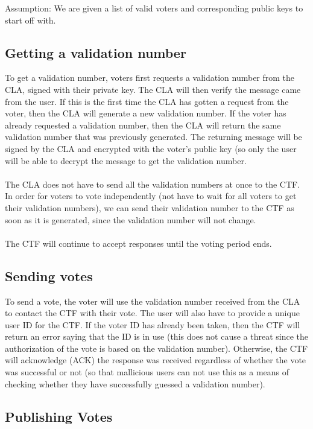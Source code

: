 \documentclass{article} \usepackage[margin=1in]{geometry} \usepackage{amsmath}
\begin{document}
Assumption: We are given a list of valid voters and corresponding public keys
to start off with.

\subsection{Getting a validation number}

To get a validation number, voters first requests a validation number from the
CLA, signed with their private key. The CLA will then verify the message came
from the user. If this is the first time the CLA has gotten a request from the
voter, then the CLA will generate a new validation number. If the voter has
already requested a validation number, then the CLA will return the same
validation number that was previously generated. The returning message will be
signed by the CLA and encrypted with the voter's public key (so only the user
will be able to decrypt the message to get the validation number. \\
\hfill \\
The CLA does not have to send all the validation numbers at once to the CTF. In
order for voters to vote independently (not have to wait for all voters to get
their validation numbers), we can send their validation number to the CTF as
soon as it is generated, since the validation number will not change.\\
\hfill \\
The CTF will continue to accept responses until the voting period ends.

\subsection{Sending votes}

To send a vote, the voter will use the validation number received from the CLA
to contact the CTF with their vote. The user will also have to provide a unique
user ID for the CTF. If the voter ID has already been taken, then the CTF will
return an error saying that the ID is in use (this does not cause a threat
since the authorization of the vote is based on the validation number).
Otherwise, the CTF will acknowledge (ACK) the response was received regardless
of whether the vote was successful or not (so that mallicious users can not use
this as a means of checking whether they have successfully guessed a validation
number).

\subsection{Publishing Votes}
\end{document}
